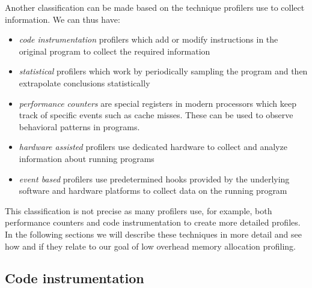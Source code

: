 Another classification can be made based on the technique profilers use to collect information. We can thus have:
\begin{itemize}
\item \textit{code instrumentation} profilers which add or modify instructions in the original program to collect the required information
\item \textit{statistical} profilers which work by periodically sampling the program and then extrapolate conclusions statistically
\item \textit{performance counters} are special registers in modern processors which keep track of specific events such as cache misses. These can be used to observe behavioral patterns in programs.
\item \textit{hardware assisted} profilers use dedicated hardware to collect and analyze information about running programs
\item \textit{event based} profilers use predetermined hooks provided by the underlying software and hardware platforms to collect data on the running program
\end{itemize}

This classification is not precise as many profilers use, for example, both performance counters and code instrumentation to create more detailed profiles. In the following sections we will describe these techniques in more detail and see how and if they relate to our goal of low overhead memory allocation profiling.



\subsection{Code instrumentation}
\label{subsection:codeinstrumentation}

